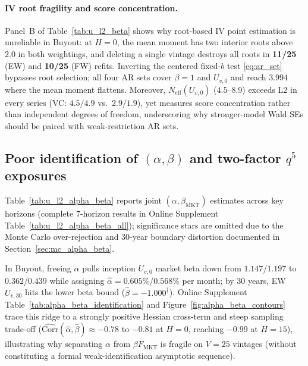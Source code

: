\documentclass[12pt]{article}
\begin{document}
\paragraph{IV root fragility and score concentration.}
Panel~B of Table~\ref{tab:u_l2_beta} shows why root-based IV point estimation is unreliable in Buyout: at $H = 0$, the mean moment has two interior roots above $2.0$ in both weightings, and deleting a single vintage destroys all roots in \textbf{11/25} (EW) and \textbf{10/25} (FW) refits.
Inverting the centered fixed-$b$ test \eqref{eq:ar_set} bypasses root selection; all four AR sets cover $\beta = 1$ and $U_{v,0}$ and reach $3.994$ where the mean moment flattens.
Moreover, $N_{\mathrm{eff}}(U_{v,0})$ ($4.5$--$8.9$) exceeds L2 in every series (VC: $4.5/4.9$ vs.\ $2.9/1.9$), yet measures score concentration rather than independent degrees of freedom, underscoring why stronger-model Wald SEs should be paired with weak-restriction AR sets.

\subsection{Poor identification of $(\alpha,\beta)$ and two-factor $q^5$ exposures}
\label{sec:empirical_alpha_bovc}

Table~\ref{tab:u_l2_alpha_beta} reports joint $(\alpha,\beta_{\mathrm{MKT}})$ estimates across key horizons (complete 7-horizon results in Online Supplement Table~\ref{tab:u_l2_alpha_beta_all}); significance stars are omitted due to the Monte Carlo over-rejection and 30-year boundary distortion documented in Section~\ref{sec:mc_alpha_beta}.



In Buyout, freeing $\alpha$ pulls inception $U_{v,0}$ market beta down from $1.147$/$1.197$ to $0.362$/$0.439$ while assigning $\hat\alpha = 0.605\%$/$0.568\%$ per month; by 30 years, EW $U_{v,30}$ hits the lower beta bound ($\hat\beta = -1.000^\dagger$).
Online Supplement Table~\ref{tab:alpha_beta_identification} and Figure~\ref{fig:alpha_beta_contours} trace this ridge to a strongly positive Hessian cross-term and steep sampling trade-off ($\widehat{\mathrm{Corr}}(\hat\alpha,\hat\beta) \approx -0.78$ to $-0.81$ at $H=0$, reaching $-0.99$ at $H=15$), illustrating why separating $\alpha$ from $\beta F_{\mathrm{MKT}}$ is fragile on $V = 25$ vintages (without constituting a formal weak-identification asymptotic sequence).
\end{document}
